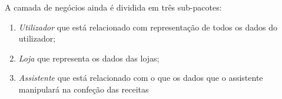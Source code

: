 A camada de negócios ainda é dividida em três sub-pacotes:
\begin{enumerate}
    \item \emph{Utilizador} que está relacionado com  representação de todos os dados do utilizador;
    \item \emph{Loja} que representa os dados das lojas;
    \item \emph{Assistente} que está relacionado com o que os dados que o assistente manipulará na confeção das receitas
\end{enumerate}

  
  
  


